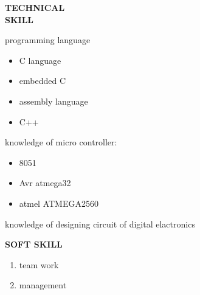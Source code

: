 \documentclass{article}
\begin{document}
  \begin{flushleft}
  	\vspace{0.4in}
  	\textbf{TECHNICAL  \\ SKILL}
  	\begin{itemize}
  		\vspace{-0.45in}
  		\addtolength{\itemindent}{1.359in}
  		
  		\item  programming language
  		{\begin{itemize}
  				\addtolength{\itemindent}{1.359in}
  				\item C language
  				\item embedded C
  				\item assembly language
  				\item C++
  				
  			\end{itemize}
  		}  
  		\item knowledge of  micro controller:
  		{\begin{itemize}
  				\addtolength{\itemindent}{1.359in}
  				\item 8051 
  				\item Avr atmega32
  				\item atmel ATMEGA2560
  				
  			\end{itemize}
  			\item knowledge of designing circuit of digital elactronics 
  		}  
  		
  	\end{itemize}
  \end{flushleft}

	\begin{flushleft} 
		
		\vspace{0.4in}
		\textbf{SOFT SKILL}
		\begin{enumerate}
			\vspace{-0.30in}
			\addtolength{\itemindent}{1.359in}
			\item team work
			\item management
			
			
		\end{enumerate}
	\end{flushleft}

	
\end{document}

